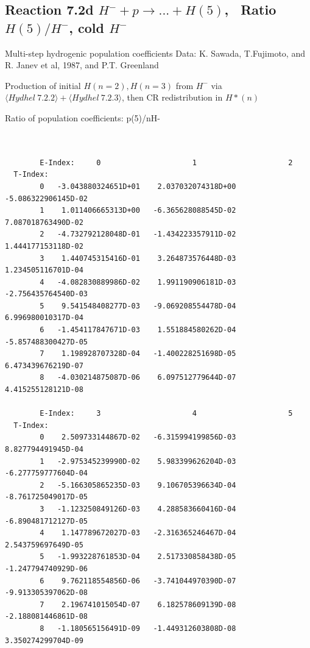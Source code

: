 \documentclass[12pt,dvipdfmx]{article}
\begin{document}
\subsection{
Reaction 7.2d $ H^- + p \rightarrow ...+ H(5) $, \   Ratio $H(5)/H^- $, cold $H^-$
}
 Multi-step hydrogenic population coefficients
 Data: K. Sawada, T.Fujimoto, \cite{kn:Sawada} and R. Janev et al, 1987, and P.T. Greenland

Production of initial $H(n=2), H(n=3)$ from $H^-$ via $ \langle Hydhel~ 7.2.2\rangle + \langle Hydhel~ 7.2.3\rangle$,
 then CR redistribution in $H*(n)$

 Ratio of population coefficients: p(5)/nH-


\begin{small}\begin{verbatim}


        E-Index:     0                     1                     2
  T-Index:
        0   -3.043880324651D+01    2.037032074318D+00   -5.086322906145D-02
        1    1.011406665313D+00   -6.365628088545D-02    7.087018763490D-02
        2   -4.732792128048D-01   -1.434223357911D-02    1.444177153118D-02
        3    1.440745315416D-01    3.264873576448D-03    1.234505116701D-04
        4   -4.082830889986D-02    1.991190906181D-03   -2.756435764540D-03
        5    9.541548408277D-03   -9.069208554478D-04    6.996980010317D-04
        6   -1.454117847671D-03    1.551884580262D-04   -5.857488300427D-05
        7    1.198928707328D-04   -1.400228251698D-05    6.473439676219D-07
        8   -4.030214875087D-06    6.097512779644D-07    4.415255128121D-08

        E-Index:     3                     4                     5
  T-Index:
        0    2.509733144867D-02   -6.315994199856D-03    8.827794491945D-04
        1   -2.975345239990D-02    5.983399626204D-03   -6.277759777604D-04
        2   -5.166305865235D-03    9.106705396634D-04   -8.761725049017D-05
        3   -1.123250849126D-03    4.288583660416D-04   -6.890481712127D-05
        4    1.147789672027D-03   -2.316365246467D-04    2.543759697649D-05
        5   -1.993228761853D-04    2.517330858438D-05   -1.247794740929D-06
        6    9.762118554856D-06   -3.741044970390D-07   -9.913305397062D-08
        7    2.196741015054D-07    6.182578609139D-08   -2.188081446861D-08
        8   -1.180565156491D-09   -1.449312603808D-08    3.350274299704D-09


\end{verbatim}
\end{small}
\end{document}

